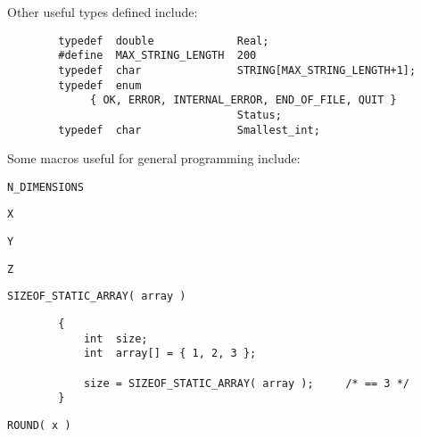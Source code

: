 Other useful types defined include:
{\bf\begin{verbatim}
        typedef  double             Real;
        #define  MAX_STRING_LENGTH  200
        typedef  char               STRING[MAX_STRING_LENGTH+1];
        typedef  enum 
             { OK, ERROR, INTERNAL_ERROR, END_OF_FILE, QUIT }
                                    Status;
        typedef  char               Smallest_int;
\end{verbatim}}

Some macros useful for general programming include:

{\bf\begin{verbatim}
N_DIMENSIONS
\end{verbatim}}


{\bf\begin{verbatim}
X
\end{verbatim}}


{\bf\begin{verbatim}
Y
\end{verbatim}}


{\bf\begin{verbatim}
Z
\end{verbatim}}


{\bf\begin{verbatim}
SIZEOF_STATIC_ARRAY( array )
\end{verbatim}}


{\bf\begin{verbatim}
        {
            int  size;
            int  array[] = { 1, 2, 3 };

            size = SIZEOF_STATIC_ARRAY( array );     /* == 3 */
        }
\end{verbatim}}

{\bf\begin{verbatim}
ROUND( x )
\end{verbatim}}


